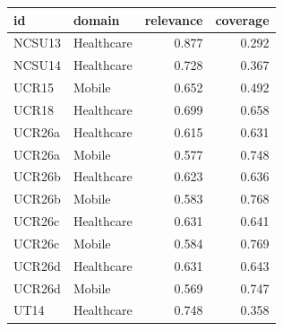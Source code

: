 \begin{tabular}{llrr}
\toprule
id & domain & relevance & coverage \\
\midrule
NCSU13 & Healthcare & 0.877 & 0.292 \\
NCSU14 & Healthcare & 0.728 & 0.367 \\
UCR15 & Mobile & 0.652 & 0.492 \\
UCR18 & Healthcare & 0.699 & 0.658 \\
UCR26a & Healthcare & 0.615 & 0.631 \\
UCR26a & Mobile & 0.577 & 0.748 \\
UCR26b & Healthcare & 0.623 & 0.636 \\
UCR26b & Mobile & 0.583 & 0.768 \\
UCR26c & Healthcare & 0.631 & 0.641 \\
UCR26c & Mobile & 0.584 & 0.769 \\
UCR26d & Healthcare & 0.631 & 0.643 \\
UCR26d & Mobile & 0.569 & 0.747 \\
UT14 & Healthcare & 0.748 & 0.358 \\
\bottomrule
\end{tabular}
